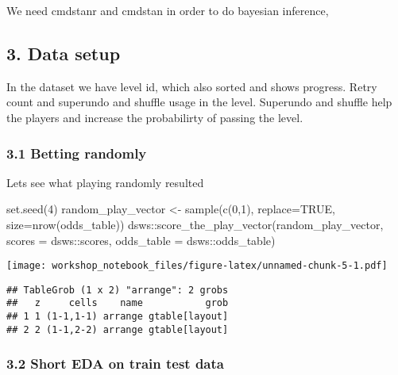 \documentclass[
]{article}
\newenvironment{Shaded}{\begin{snugshade}}{\end{snugshade}}
\newcommand{\AttributeTok}[1]{\textcolor[rgb]{0.77,0.63,0.00}{#1}}
\newcommand{\ConstantTok}[1]{\textcolor[rgb]{0.00,0.00,0.00}{#1}}
\newcommand{\DecValTok}[1]{\textcolor[rgb]{0.00,0.00,0.81}{#1}}
\newcommand{\FunctionTok}[1]{\textcolor[rgb]{0.00,0.00,0.00}{#1}}
\newcommand{\NormalTok}[1]{#1}
\newcommand{\OtherTok}[1]{\textcolor[rgb]{0.56,0.35,0.01}{#1}}
\newcommand{\SpecialCharTok}[1]{\textcolor[rgb]{0.00,0.00,0.00}{#1}}
\begin{document}
We need cmdstanr and cmdstan in order to do bayesian inference,

\hypertarget{data-setup}{%
\subsection{3. Data setup}\label{data-setup}}

In the dataset we have level id, which also sorted and shows progress.
Retry count and superundo and shuffle usage in the level. Superundo and
shuffle help the players and increase the probabilirty of passing the
level.

\hypertarget{betting-randomly}{%
\subsubsection{3.1 Betting randomly}\label{betting-randomly}}

Lets see what playing randomly resulted

\begin{Shaded}
\begin{Highlighting}[]
\FunctionTok{set.seed}\NormalTok{(}\DecValTok{4}\NormalTok{)}
\NormalTok{random\_play\_vector }\OtherTok{\textless{}{-}} \FunctionTok{sample}\NormalTok{(}\FunctionTok{c}\NormalTok{(}\DecValTok{0}\NormalTok{,}\DecValTok{1}\NormalTok{), }\AttributeTok{replace=}\ConstantTok{TRUE}\NormalTok{, }\AttributeTok{size=}\FunctionTok{nrow}\NormalTok{(odds\_table))}
\NormalTok{dsws}\SpecialCharTok{::}\FunctionTok{score\_the\_play\_vector}\NormalTok{(random\_play\_vector, }\AttributeTok{scores =}\NormalTok{ dsws}\SpecialCharTok{::}\NormalTok{scores, }\AttributeTok{odds\_table =}\NormalTok{ dsws}\SpecialCharTok{::}\NormalTok{odds\_table)}
\end{Highlighting}
\end{Shaded}

\texttt{[image: workshop\_notebook\_files/figure-latex/unnamed-chunk-5-1.pdf]}

\begin{verbatim}
## TableGrob (1 x 2) "arrange": 2 grobs
##   z     cells    name           grob
## 1 1 (1-1,1-1) arrange gtable[layout]
## 2 2 (1-1,2-2) arrange gtable[layout]
\end{verbatim}

\hypertarget{short-eda-on-train-test-data}{%
\subsubsection{3.2 Short EDA on train test
data}\label{short-eda-on-train-test-data}}
\end{document}
